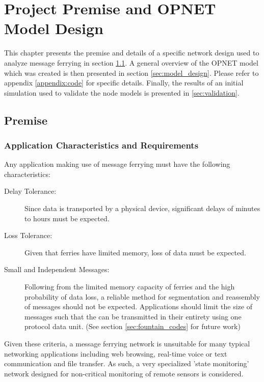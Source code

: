 \chapter{Project Premise and OPNET Model Design} 

This chapter presents the premise and details of a specific network design used to analyze message ferrying in section \ref{sec:premise}.
A general overview of the OPNET model which was created is then presented in section \ref{sec:model_design}.
Please refer to appendix \ref{appendix:code} for specific details.
Finally, the results of an initial simulation used to validate the node models is presented in \ref{sec:validation}.

\section{Premise}
\label{sec:premise}


\subsection{Application Characteristics and Requirements}
\label{sec:premise_appchar}

Any application making use of message ferrying must have the following characteristics:

\begin{description}
\item[Delay Tolerance: ]
Since data is transported by a physical device, significant delays of minutes to hours must be expected.
\item[Loss Tolerance: ]
Given that ferries have limited memory, loss of data must be expected.
\item[Small and Independent Messages: ]
Following from the limited memory capacity of ferries and the high probability of data loss, a reliable method for segmentation and reassembly of messages should not be expected. 
Applications should limit the size of messages such that the can be transmitted in their entirety using one protocol data unit.
%
(See section \ref{sec:fountain_codes} for future work)
\end{description}

Given these criteria, a message ferrying network is unsuitable for many typical networking applications including web browsing, real-time voice or text communication and file transfer.
As such, a very specialized 'state monitoring' network designed for non-critical monitoring of remote sensors is considered.

